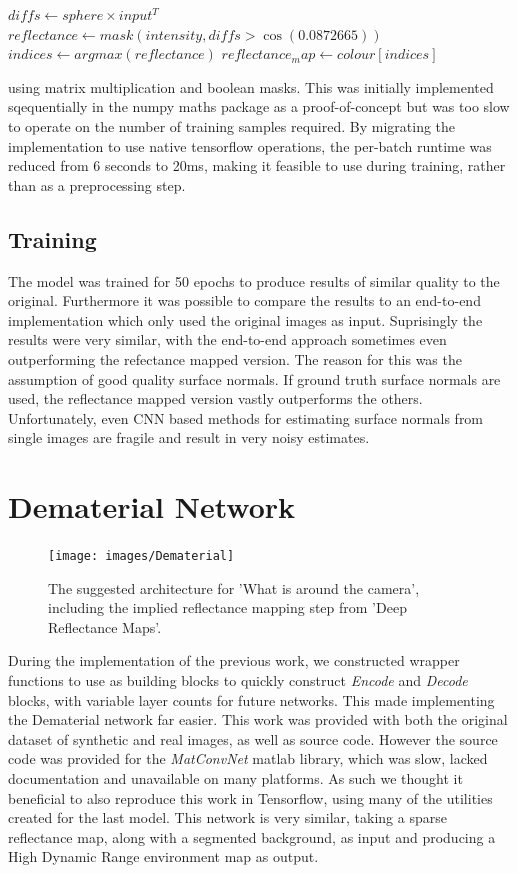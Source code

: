 \documentclass[ %
                    author={Gavin Parker},
                supervisor={Dr. Neill Campbell},
                    degree={MEng},
                     title={Deep Siamese Networks for Illumination Estimation from Stereo Images},
                  subtitle={},
                      type={research},
                      year={2018} ]{dissertation}
\begin{document}
\begin{algorithm}
$ diffs \leftarrow sphere \times input^T $\;
$ reflectance \leftarrow mask(intensity, diffs > \cos(0.0872665)) $\;
$ indices \leftarrow argmax(reflectance) $\;
$ reflectance_map \leftarrow colour[indices] $\;
\end{algorithm}
using matrix multiplication and boolean masks. This was initially implemented sqequentially in the numpy maths package as a proof-of-concept but was too slow to operate on the number of training samples required. By migrating the implementation to use native tensorflow operations, the per-batch runtime was reduced from 6 seconds to 20ms, making it feasible to use during training, rather than as a preprocessing step.

\subsection{Training}
The model was trained for 50 epochs to produce results of similar quality to the original. Furthermore it was possible to compare the results to an end-to-end implementation which only used the original images as input. Suprisingly the results were very similar, with the end-to-end approach sometimes even outperforming the refectance mapped version. The reason for this was the assumption of good quality surface normals. If ground truth surface normals are used, the reflectance mapped version vastly outperforms the others. Unfortunately, even CNN based methods for estimating surface normals from single images are fragile and result in very noisy estimates.
\section{Dematerial Network}
\begin{figure}[H]
\texttt{[image: images/Dematerial]}
\caption 
\newline
The suggested architecture for 'What is around the camera', including the implied reflectance mapping step from 'Deep Reflectance Maps'.
\end{figure}
During the implementation of the previous work, we constructed wrapper functions to use as building blocks to quickly construct \textit{Encode} and \textit{Decode} blocks, with variable layer counts for future networks. This made implementing the Dematerial network far easier. This work was provided with both the original dataset of synthetic and real images, as well as source code. However the source code was provided for the \textit{MatConvNet} matlab library, which was slow, lacked documentation and unavailable on many platforms. As such we thought it beneficial to also reproduce this work in Tensorflow, using many of the utilities created for the last model. This network is very similar, taking a sparse reflectance map, along with a segmented background, as input and producing a High Dynamic Range environment map as output.
\end{document}
